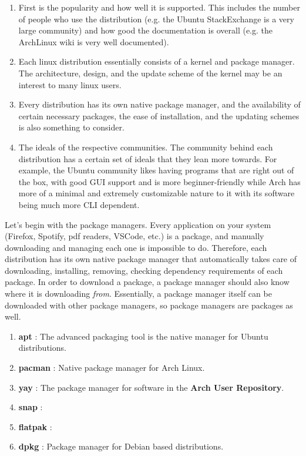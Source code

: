   \begin{enumerate}
    \item First is the popularity and how well it is supported. This includes the number of people who use the distribution (e.g. the Ubuntu StackExchange is a very large community) and how good the documentation is overall (e.g. the ArchLinux wiki is very well documented). 
    \item Each linux distribution essentially consists of a kernel and package manager. The architecture, design, and the update scheme of the kernel may be an interest to many linux users.  
    \item Every distribution has its own native package manager, and the availability of certain necessary packages, the ease of installation, and the updating schemes is also something to consider.  
    \item The ideals of the respective communities. The community behind each distribution has a certain set of ideals that they lean more towards. For example, the Ubuntu community likes having programs that are right out of the box, with good GUI support and is more beginner-friendly while Arch has more of a minimal and extremely customizable nature to it with its software being much more CLI dependent. 
  \end{enumerate}

  Let's begin with the package managers. Every application on your system (Firefox, Spotify, pdf readers, VSCode, etc.) is a package, and manually downloading and managing each one is impossible to do. Therefore, each distribution has its own native package manager that automatically takes care of downloading, installing, removing, checking dependency requirements of each package. In order to download a package, a package manager should also know where it is downloading \textit{from}. Essentially, a package manager itself can be downloaded with other package managers, so package managers are packages as well. 
  
  \begin{enumerate}
    \item \textbf{apt} : The advanced packaging tool is the native manager for Ubuntu distributions. 
    \item \textbf{pacman} : Native package manager for Arch Linux. 
    \item \textbf{yay} : The package manager for software in the \textbf{Arch User Repository}. 
    \item \textbf{snap} : 
    \item \textbf{flatpak} : 
    \item \textbf{dpkg} : Package manager for Debian based distributions. 
  \end{enumerate}

